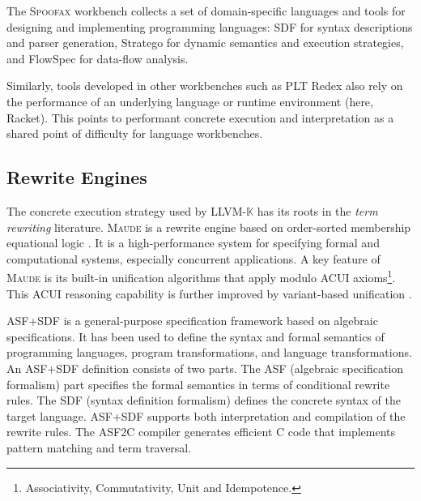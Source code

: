 \documentclass{article}
\theoremstyle{definition}
\newcommand{\K}{$\mathbb{K}$\xspace}
\newcommand{\KL}{LLVM-\K}
\begin{document}
The \textsc{Spoofax} workbench collects a set of domain-specific languages and
tools for designing and implementing programming languages: SDF \cite{Vis97} for
syntax descriptions and parser generation, Stratego \cite{VBT98} for dynamic
semantics and execution strategies, and FlowSpec \cite{SV17} for data-flow
analysis. 

Similarly, tools developed in other workbenches such as PLT Redex \cite{FFF09}
also rely on the performance of an underlying language or runtime environment
(here, Racket). This points to performant concrete execution and interpretation
as a shared point of difficulty for language workbenches.


















\subsection{Rewrite Engines}

The concrete execution strategy used by \KL has its roots in the \emph{term rewriting} literature. 
\textsc{Maude} \cite{Clavel2007} is a rewrite engine based on order-sorted
membership equational logic \cite{membership-algebra}.
It is a high-performance system for specifying formal and computational systems, especially concurrent applications.  
A key feature of \textsc{Maude} is its built-in unification algorithms that apply modulo
ACUI axioms\footnote{Associativity, Commutativity, Unit and Idempotence.}.
This ACUI reasoning capability is further improved by variant-based unification
\cite{variant-based-narrowing}. 

\textsc{ASF+SDF} \cite{asf-sdf} is a general-purpose specification framework
based on algebraic specifications. 
It has been used to define the syntax and formal semantics of programming languages, program transformations, and language transformations. 
An ASF+SDF definition consists of two parts. The ASF (algebraic specification formalism)
part specifies the formal semantics in terms of conditional rewrite rules.
The SDF (syntax definition formalism) defines the concrete syntax of the target language. 
ASF+SDF supports both interpretation and compilation of the rewrite rules. 
The ASF2C compiler generates efficient C code that implements pattern matching and term traversal. 
\end{document}
